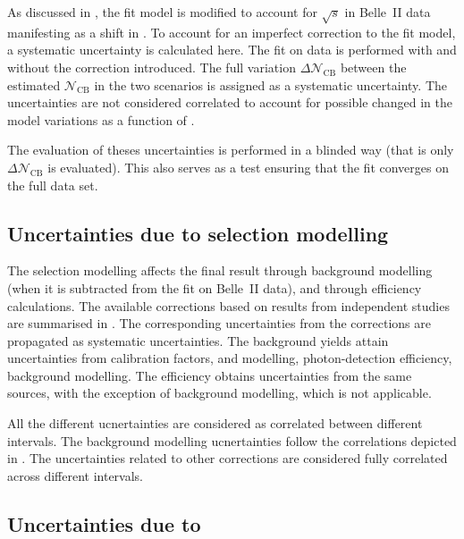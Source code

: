 As discussed in , the fit model is modified to account for $\sqrt{s}$ in Belle~II data manifesting as a shift in \Mbc.
To account for an imperfect correction to the fit model, a systematic uncertainty is calculated here.
The fit on data is performed with and without the \Mbc correction introduced.
The full variation $\Delta\mathcal{N}_{\mathrm{CB}}$ between the estimated $\mathcal{N}_{\mathrm{CB}}$ in the two scenarios is assigned as a systematic uncertainty.
The uncertainties are not considered correlated to account for possible changed in the model variations as a function of \EB.

The evaluation of theses uncertainties is performed in a blinded way (that is only $\Delta\mathcal{N}_{\mathrm{CB}}$  is evaluated).
This also serves as a test ensuring that the fit converges on the full data set.

\subsection{Uncertainties due to selection modelling}\label{sec:correction_systematic}

The selection modelling affects the final result through background modelling (when it is subtracted from the \Mbc fit on Belle~II data),
and through \BtoXsgamma efficiency calculations.
The available corrections based on results from independent studies are summarised in .
The corresponding uncertainties from the corrections are propagated as systematic uncertainties.
The background yields attain uncertainties from \FEI calibration factors, \piVeto and \etaVeto modelling, photon-detection efficiency, background modelling. 
The \BtoXsgamma efficiency obtains uncertainties from the same sources, with the exception of background modelling, which is not applicable.

All the different ucnertainties are considered as correlated between different \EB intervals.
The background modelling ucnertainties follow the correlations depicted in .
The uncertainties related to other corrections are considered fully correlated across different \EB intervals.

\subsection{Uncertainties due to \texorpdfstring{\BtoXdgamma}{B->Xd gamma}}\label{sec:xdgamma_systematic}

